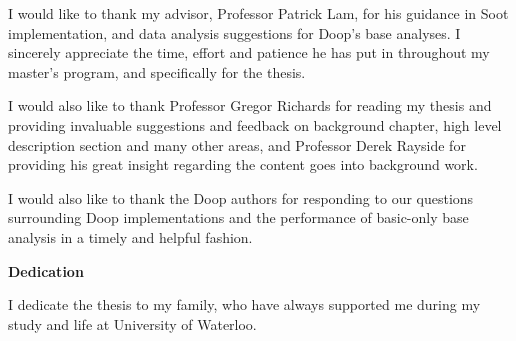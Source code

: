 I would like to thank my advisor, Professor Patrick Lam, for his guidance in Soot implementation, and data analysis suggestions for Doop's base analyses. I sincerely appreciate the time, effort and patience he has put in throughout my master's program, and specifically for the thesis.

I would also like to thank Professor Gregor Richards for reading my thesis and providing invaluable suggestions and feedback on background chapter, high level description section and many other areas, and Professor Derek Rayside for providing his great insight regarding the content goes into background work.

I would also like to thank the Doop authors for responding to our questions surrounding Doop implementations and the performance of basic-only base analysis in a timely and helpful fashion.

\cleardoublepage


\begin{center}\textbf{Dedication}\end{center}

I dedicate the thesis to my family, who have always supported me during my study and life at University of Waterloo.
\cleardoublepage

\renewcommand\contentsname{Table of Contents}
\tableofcontents
\cleardoublepage
{}    %

\listoffigures
\cleardoublepage
{}		%

\listoftables
\cleardoublepage
{}		%


